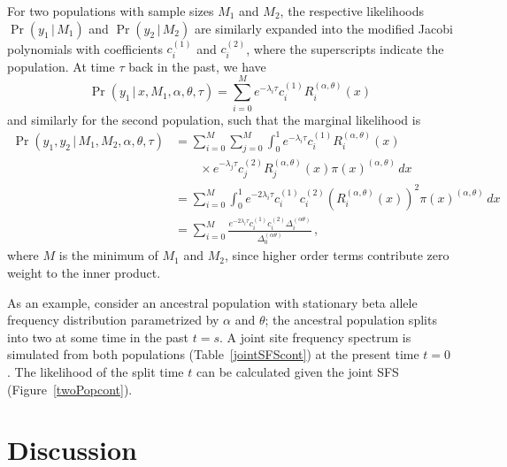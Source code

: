 \documentclass[preprint]{elsarticle}
\newcommand\given{{\,|\,}}
\begin{document}
For two populations with sample sizes $M_1$ and $M_2$, the respective likelihoods $\Pr(y_1\given M_1)$ and $\Pr(y_2\given M_2)$ are similarly expanded into the modified Jacobi polynomials with coefficients $c_i^{(1)}$ and $c_i^{(2)}$, where the superscripts indicate the population. At time $\tau$ back in the past, we have
\begin{equation}
    \Pr(y_1\given x, M_1,\alpha,\theta,\tau)=
    \sum_{i=0}^{M} e^{-\lambda_i\tau}c_i^{(1)}R_i^{(\alpha,\theta)}(x)
\end{equation}
and similarly for the second population, such that the marginal likelihood is
\begin{equation}
\begin{split}
    \Pr(y_1,y_2\given M_1,M_2,\alpha,\theta,\tau)&=
    \sum_{i=0}^{M}\sum_{j=0}^{M}\int_0^1 e^{-\lambda_i\tau}c_i^{(1)}R_i^{(\alpha,\theta)}(x)\\
    &\qquad\times e^{-\lambda_j\tau}c_j^{(2)} R_j^{(\alpha,\theta)}(x)\pi(x)^{(\alpha,\theta)}  \,dx\\&=
    \sum_{i=0}^{M}\int_0^1 e^{-2\lambda_i\tau}c_i^{(1)}c_i^{(2)} (R_i^{(\alpha,\theta)}(x))^2\pi(x)^{(\alpha,\theta)}  \,dx\\
    &=\sum_{i=0}^{M}\frac{e^{-2\lambda_i\tau}c_i^{(1)} c_i^{(2)}\Delta_i^{(\alpha\theta)}}{\Delta_0^{(\alpha\theta)}}\,,
\end{split}
\end{equation}
where $M$ is the minimum of $M_1$ and $M_2$, since higher order terms contribute zero weight to the inner product. 

As an example, consider an ancestral population with stationary beta allele frequency distribution parametrized by $\alpha$ and $\theta$; the ancestral population splits into two at some time in the past $t=s$. A joint site frequency spectrum is simulated from both populations (Table~\ref{jointSFScont}) at the present time $t=0$. The likelihood of the split time $t$ can be calculated given the joint SFS (Figure~\ref{twoPopcont}). 

\section{Discussion}
\end{document}
